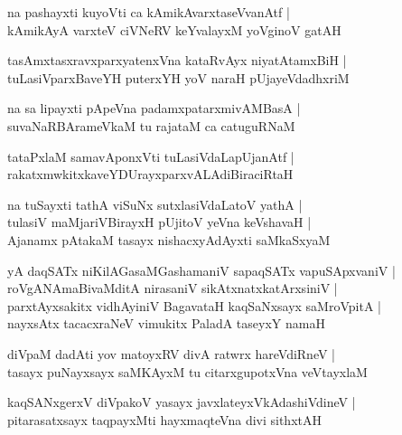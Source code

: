 \documentclass[twoside,12pt,openright]{book}
\newcounter{shloka}[chapter]
\begin{document}
\begin{shloka}%
na pashayxti kuyoVti ca kAmikAvarxtaseVvanAtf |\\
kAmikAyA varxteV ciVNeRV keYvalayxM yoVginoV gatAH 
\end{shloka}

\begin{shloka}%
tasAmxtasxravxparxyatenxVna kataRvAyx niyatAtamxBiH |\\
tuLasiVparxBaveYH puterxYH yoV naraH pUjayeVdadhxriM
\end{shloka}

\begin{shloka}%
na sa lipayxti pApeVna padamxpatarxmivAMBasA |\\
suvaNaRBArameVkaM tu rajataM ca catuguRNaM 
\end{shloka}

\begin{shloka}%
tataPxlaM samavAponxVti tuLasiVdaLapUjanAtf |\\
rakatxmwkitxkaveYDUrayxparxvALAdiBiraciRtaH
\end{shloka}

\begin{shloka}%
na tuSayxti tathA viSuNx sutxlasiVdaLatoV yathA |\\
tulasiV maMjariVBirayxH pUjitoV yeVna keVshavaH |\\
Ajanamx pAtakaM tasayx nishacxyAdAyxti saMkaSxyaM 
\end{shloka}

\begin{shloka}%
yA daqSATx niKilAGasaMGashamaniV sapaqSATx vapuSApxvaniV |\\
roVgANAmaBivaMditA nirasaniV sikAtxnatxkatArxsiniV |\\
parxtAyxsakitx vidhAyiniV BagavataH kaqSaNxsayx saMroVpitA |\\
nayxsAtx tacacxraNeV vimukitx PaladA taseyxY namaH 
\end{shloka}

\begin{shloka}%
diVpaM dadAti yov matoyxRV divA ratwrx hareVdiRneV |\\
tasayx puNayxsayx saMKAyxM tu citarxgupotxVna veVtayxlaM 
\end{shloka}

\begin{shloka}%
kaqSANxgerxV diVpakoV yasayx javxlateyxVkAdashiVdineV |\\
pitarasatxsayx taqpayxMti hayxmaqteVna divi sithxtAH
\end{shloka}
\end{document}
